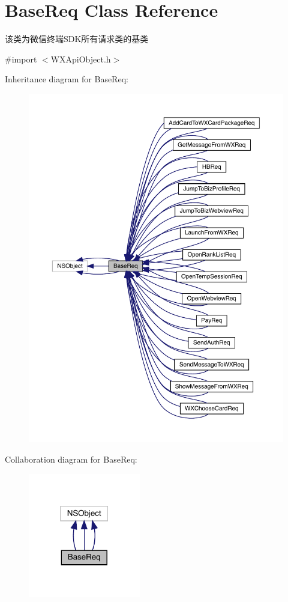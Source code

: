 \hypertarget{interface_base_req}{}\section{Base\+Req Class Reference}
\label{interface_base_req}


该类为微信终端\+S\+D\+K所有请求类的基类  




{\ttfamily \#import $<$W\+X\+Api\+Object.\+h$>$}



Inheritance diagram for Base\+Req\+:\nopagebreak
\begin{figure}[H]
\begin{center}
\leavevmode
\includegraphics[width=350pt]{interface_base_req__inherit__graph}
\end{center}
\end{figure}


Collaboration diagram for Base\+Req\+:\nopagebreak
\begin{figure}[H]
\begin{center}
\leavevmode
\includegraphics[width=139pt]{interface_base_req__coll__graph}
\end{center}
\end{figure}

